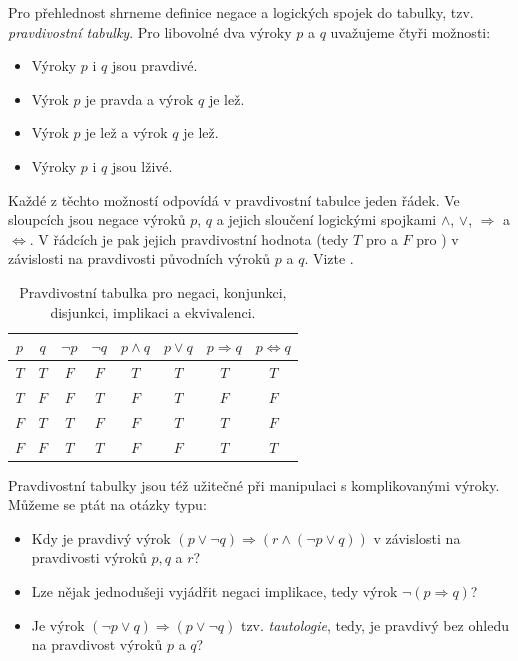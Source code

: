 Pro přehlednost shrneme definice negace a logických spojek do tabulky, tzv.
\emph{pravdivostní tabulky}. Pro libovolné dva výroky $p$ a $q$ uvažujeme čtyři
možnosti:
\begin{itemize}
  \item Výroky $p$ i $q$ jsou pravdivé.
  \item Výrok $p$ je pravda a výrok $q$ je lež.
  \item Výrok $p$ je lež a výrok $q$ je lež.
  \item Výroky $p$ i $q$ jsou lživé.
\end{itemize}
Každé z těchto možností odpovídá v pravdivostní tabulce jeden řádek. Ve
sloupcích jsou negace výroků $p$, $q$ a jejich sloučení logickými spojkami $
\wedge $, $ \vee $, $ \Rightarrow $ a $ \Leftrightarrow $. V řádcích je pak
jejich pravdivostní hodnota (tedy $T$ pro  a $F$ pro ) v
závislosti na pravdivosti původních výroků $p$ a $q$. Vizte
.

\begin{table}[ht]
  \centering
  \begin{tabular}{cc|cccccc}
    $p$ & $q$ & $\neg p$ & $\neg q$ & $p \wedge q$ & $p \vee q$ & $p \Rightarrow
    q$ & $p \Leftrightarrow q$\\[3pt]
    \toprule
    $T$ & $T$ & $F$ & $F$ & $T$ & $T$ & $T$ & $T$\\
    $T$ & $F$ & $F$ & $T$ & $F$ & $T$ & $F$ & $F$\\
    $F$ & $T$ & $T$ & $F$ & $F$ & $T$ & $T$ & $F$\\
    $F$ & $F$ & $T$ & $T$ & $F$ & $F$ & $T$ & $T$\\
    \bottomrule
  \end{tabular}
  \caption{Pravdivostní tabulka pro negaci, konjunkci, disjunkci, implikaci a
  ekvivalenci.}
  \label{table:pravdivostni-tabulka}
\end{table}

Pravdivostní tabulky jsou též užitečné při manipulaci s komplikovanými výroky.
Můžeme se ptát na otázky typu:
\begin{itemize}
  \item Kdy je pravdivý výrok $(p \vee \neg q) \Rightarrow (r \wedge
      (\neg p \vee
    q))$ v závislosti na pravdivosti výroků $p, q$ a $r$?
  \item Lze nějak jednodušeji vyjádřit negaci implikace, tedy výrok $\neg (p
    \Rightarrow q)$?
  \item Je výrok $(\neg p \vee q) \Rightarrow (p \vee \neg q)$ tzv.
    \emph{tautologie}, tedy, je pravdivý bez ohledu na pravdivost výroků $p$ a
    $q$?
\end{itemize}

